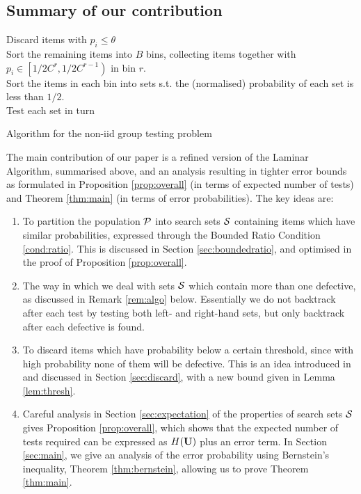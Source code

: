 \subsection{Summary of our contribution} \label{sec:algo}

\begin{algorithm}
 \SetLine 
 Discard items with \(p_i \leq \theta\)
 \\
 Sort the remaining items into \(B\) bins, collecting items together with \(p_i \in \left[1/2C^r,1/2C^{r-1}\right)\) in bin \(r\).
 \\
 Sort the items in each bin into sets s.t. the (normalised) probability of each set is less than \(1/2\).
 \\
 Test each set in turn
 \\

 \caption{Algorithm for the non-iid group testing problem}
\end{algorithm}

The main contribution of our paper is a refined version of the Laminar Algorithm, summarised above, and an analysis resulting in tighter error bounds as formulated in Proposition \ref{prop:overall} (in terms of expected number of tests) and Theorem \ref{thm:main} (in terms
of error probabilities).
The  key ideas are:
\begin{enumerate}
\item To partition the population ${\mathcal{P}}$ into search  sets  ${\mathcal{S}}$ containing items which have similar probabilities,
expressed through the Bounded Ratio Condition \ref{cond:ratio}. This is discussed in Section \ref{sec:boundedratio}, and optimised in the proof
of Proposition \ref{prop:overall}.
\item The way in which we deal with sets ${\mathcal{S}}$ which contain more than one defective, as discussed in Remark \ref{rem:algo} below. Essentially we do not backtrack after each test by
testing both left- and right-hand sets, but only backtrack after each defective is found.
\item To discard items which have probability below a certain
threshold, since with high probability none of them will be defective. This is an idea introduced in \cite{li5} and discussed
in Section \ref{sec:discard}, with a new bound given in Lemma \ref{lem:thresh}.
\item  Careful analysis in Section \ref{sec:expectation} of the properties of search sets ${\mathcal{S}}$ gives Proposition \ref{prop:overall}, which shows that the expected number of tests required can
be expressed as $H({\mathbf{ U}})$ plus an error term. In Section \ref{sec:main},
we give an analysis of the error probability using Bernstein's inequality, Theorem \ref{thm:bernstein}, allowing us to
prove Theorem \ref{thm:main}.
\end{enumerate}
%


